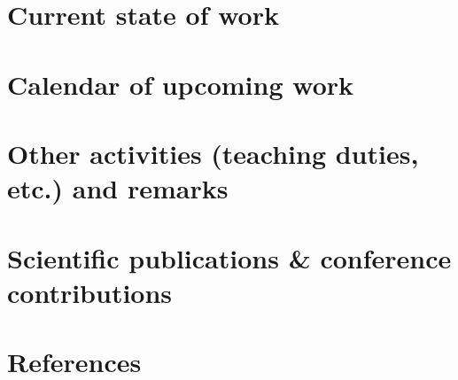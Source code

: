 \documentclass[11pt,titlepage]{article}
\begin{document}
\section{Current state of work}

\section{Calendar of upcoming work}

\section{Other activities (teaching duties, etc.) and remarks}

\section{Scientific publications \& conference contributions}

\nocite{Wicaksono2014a}
\nocite{Wicaksono2014b}
\nocite{Wicaksono2014c}
\nocite{Wicaksono2015a}
\nocite{Wicaksono2015b}
\nocite{Wicaksono2015c}

\printbibliography[heading=none]

\section{References}

\printbibliography[heading=none]
\end{document}
